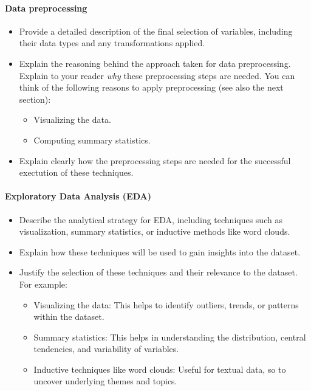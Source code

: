 \paragraph{Data preprocessing}
\begin{itemize}
    \item Provide a detailed description of  the final selection of variables, including their data types and any transformations applied.
    \item Explain the reasoning behind the approach taken for data preprocessing. Explain to your reader \emph{why} these preprocessing steps are needed. You can think of the following reasons to apply preprocessing (see also the next section):
        \begin{itemize}
            \item Visualizing the data.
            \item Computing summary statistics.
        \end{itemize}
  \item Explain clearly how the preprocessing steps are needed for the successful exectution of these techniques. 
\end{itemize}

\paragraph{Exploratory Data Analysis (EDA)}
\begin{itemize}
    \item Describe the analytical strategy for EDA, including techniques such as visualization, summary statistics, or inductive methods like word clouds.
    \item Explain how these techniques will be used to gain insights into the dataset.
	\item Justify the selection of these techniques and their relevance to the dataset. For example:
	\begin{itemize}
		\item Visualizing the data: This helps to identify outliers, trends, or patterns within the dataset.
		\item Summary statistics: This helps in understanding the distribution, central tendencies, and variability of variables.
		\item Inductive techniques like word clouds: Useful for textual data, so to uncover underlying themes and topics.
	\end{itemize}
\end{itemize}

